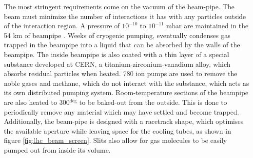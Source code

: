 \par The most stringent requirements come on the vacuum of the
beam-pipe.  The beam must minimize the number of interactions it has
with any particles outside of the interaction region.  A pressure of
$10^{-10}$ to $10^{-11}$ mbar are maintained in the 54 km of
beampipe \cite{LHC:LHC_lhc_vacuum_cernWebsite}.  Weeks of cryogenic
pumping, eventually condenses gas trapped in the beampipe into a
liquid that can be absorbed by the walls of the beampipe.  The inside
beampipe is also coated with a thin layer of a special substance 
developed at CERN, a titanium-zirconium-vanadium alloy, which absorbs
residual particles when heated.  780 ion pumps are used to remove the
noble gases and methane, which do not interact with the substance,
which acts as its own distributed pumping system.  Room-temperature
sections of the beampipe are also heated to 300$^{\deg}$ to be
baked-out from the outside.  This is done to periodically remove 
any material which may have settled and become trapped. Additionally,
the beam-pipe is designed with a racetrack shape, which optimises the
available aperture while leaving space for the cooling tubes, as shown
in figure \ref{fig:lhc_beam_screen}.  Slits also allow for gas
molecules to be easily pumped out from inside its volume.   

